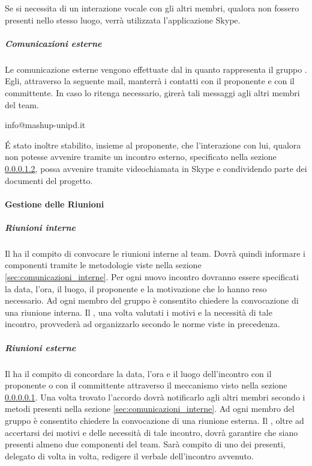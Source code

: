				Se si necessita di un interazione vocale con gli altri membri, qualora non fossero presenti nello stesso luogo, verrà utilizzata l'applicazione Skype.
				\subparagraph{Comunicazioni esterne}
				\label{sec:comunicazioni_esterne}
				Le comunicazione esterne vengono effettuate dal \roleProjectManager{} in quanto rappresenta il gruppo \groupName. \newline
				Egli, attraverso la seguente mail, manterrà i contatti con il proponente e con il committente. In caso lo ritenga necessario, girerà tali messaggi agli altri membri del team.
					\begin{center}
						info@mashup-unipd.it
					\end{center}
					\'E stato inoltre stabilito, insieme al proponente, che l'interazione con lui, qualora non potesse avvenire tramite un incontro esterno, specificato nella sezione \ref{sec:riunioni_esterne}, possa avvenire tramite videochiamata in Skype	e condividendo parte dei documenti del progetto.	
			\paragraph{Gestione delle Riunioni}
				\subparagraph{Riunioni interne}
				Il \roleProjectManager{} ha il compito di convocare le riunioni interne al team. Dovrà quindi informare i componenti tramite le metodologie viste nella sezione \ref{sec:comunicazioni_interne}.\newline
				Per ogni nuovo incontro dovranno essere specificati la data, l’ora, il luogo, il proponente e la motivazione che lo hanno reso necessario. \newline
				Ad ogni membro del gruppo è consentito chiedere la convocazione di una riunione interna. Il \roleProjectManager{}, una volta valutati i motivi e la necessità di tale incontro, provvederà ad organizzarlo secondo le norme viste in precedenza.
				\subparagraph{Riunioni esterne} \label{sec:riunioni_esterne}
				Il \roleProjectManager{} ha il compito di concordare la data, l’ora e il luogo dell'incontro con il proponente o con il committente attraverso 	il meccanismo visto nella sezione \ref{sec:comunicazioni_esterne}. \newline
				Una volta trovato l'accordo dovrà notificarlo agli altri membri secondo i metodi presenti nella sezione \ref{sec:comunicazioni_interne}. \newline
				Ad ogni membro del gruppo è consentito chiedere la convocazione di una riunione esterna. Il \roleProjectManager, oltre ad accertarsi dei motivi e delle necessità di tale incontro, dovrà garantire che siano presenti almeno due componenti del team. Sarà compito di uno dei presenti, delegato di volta in volta, redigere il verbale dell’incontro avvenuto.
			
